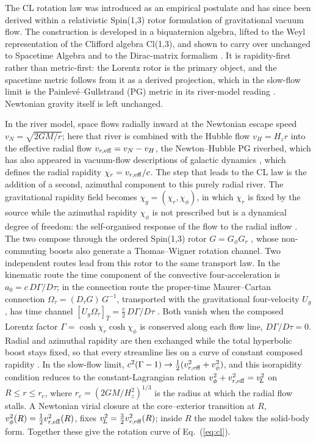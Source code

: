\documentclass[11pt,a4paper]{article}
\newcommand{\vL}{v_{\!L}}
\begin{document}
The CL rotation law was introduced as an empirical postulate \citep{deHaas2018} and has since been derived within a relativistic Spin(1,3) rotor formulation of gravitational vacuum flow. The construction is developed in a biquaternion algebra, lifted to the Weyl representation of the Clifford algebra Cl(1,3), and shown to carry over unchanged to Spacetime Algebra and to the Dirac-matrix formalism \citep{deHaasSpin}. It is rapidity-first rather than metric-first: the Lorentz rotor is the primary object, and the spacetime metric follows from it as a derived projection, which in the slow-flow limit is the Painlev\'e--Gullstrand (PG) metric \citep{Painleve1921,Gullstrand1922} in its river-model reading \citep{Hamilton2008,deHaasMC}. Newtonian gravity itself is left unchanged.

In the river model, space flows radially inward at the Newtonian escape speed $v_N=\sqrt{2GM/r}$; here that river is combined with the Hubble flow $v_H=H_zr$ into the effective radial flow $v_{r,\rm eff}=v_N-v_H$, the Newton--Hubble PG riverbed, which has also appeared in vacuum-flow descriptions of galactic dynamics \citep{Wong2016}, which defines the radial rapidity $\chi_r=v_{r,\rm eff}/c$. The step that leads to the CL law is the addition of a second, azimuthal component to this purely radial river. The gravitational rapidity field becomes $\chi_g=(\chi_r,\chi_\phi)$, in which $\chi_r$ is fixed by the source while the azimuthal rapidity $\chi_\phi$ is not prescribed but is a dynamical degree of freedom: the self-organised response of the flow to the radial inflow \citep{deHaasSpin}. The two compose through the ordered Spin(1,3) rotor $G=G_\phi G_r$ \citep{deHaasGFD,deHaasRapidity}, whose non-commuting boosts also generate a Thomas--Wigner rotation channel. Two independent routes lead from this rotor to the same transport law. In the kinematic route the time component of the convective four-acceleration is $a_0=c\,D\Gamma/D\tau$; in the connection route the proper-time Maurer--Cartan connection $\Omega_\tau=(D_\tau G)\,G^{-1}$, transported with the gravitational four-velocity $U_g$, has time channel $[U_g\Omega_\tau]_{\hat T}=\tfrac{c}{2}\,D\Gamma/D\tau$ \citep{deHaasMC,deHaasSpin}. Both vanish when the composed Lorentz factor $\Gamma=\cosh\chi_r\cosh\chi_\phi$ is conserved along each flow line, $D\Gamma/D\tau=0$. Radial and azimuthal rapidity are then exchanged while the total hyperbolic boost stays fixed, so that every streamline lies on a curve of constant composed rapidity \citep{deHaasRapidity}. In the slow-flow limit, $c^2(\Gamma-1)\to\tfrac12(v_{r,\rm eff}^2+v_\phi^2)$, and this isorapidity condition reduces to the constant-Lagrangian relation $v_\phi^2+v_{r,\rm eff}^2=\vL^2$ on $R\le r\le r_c$, where $r_c=(2GM/H_z^2)^{1/3}$ is the radius at which the radial flow stalls. A Newtonian virial closure at the core--exterior transition at $R$, $v_\phi^2(R)=\tfrac12v_{r,\rm eff}^2(R)$, fixes $\vL^2=\tfrac32v_{r,\rm eff}^2(R)$; inside $R$ the model takes the solid-body form. Together these give the rotation curve of Eq.~(\ref{eq:cl}).
\end{document}
